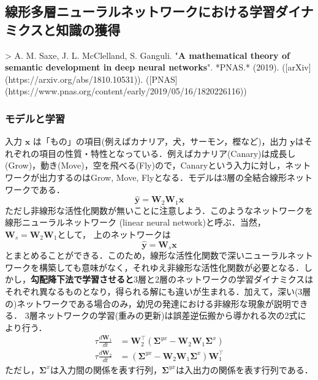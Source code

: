 \subsection{線形多層ニューラルネットワークにおける学習ダイナミクスと知識の獲得}> A. M. Saxe, J. L. McClelland, S. Ganguli. "\textbf{A mathematical theory of semantic development in deep neural networks}". *PNAS.* (2019). ([arXiv](https://arxiv.org/abs/1810.10531)). ([PNAS](https://www.pnas.org/content/early/2019/05/16/1820226116))
\subsubsection{モデルと学習}入力 $\mathbf{x}$ は「もの」の項目(例えばカナリア，犬，サーモン，樫など)，出力 $\mathbf{y}$はそれぞれの項目の性質・特性となっている．例えばカナリア(Canary)は成長し(Grow)，動き(Move)，空を飛べる(Fly)ので，Canaryという入力に対し，ネットワークが出力するのはGrow, Move, Flyとなる．モデルは3層の全結合線形ネットワークである．
$$
\hat{\mathbf{y}}=\mathbf{W}_2 \mathbf{W}_1\mathbf{x} 
$$
ただし非線形な活性化関数が無いことに注意しよう．このようなネットワークを線形ニューラルネットワーク (linear neural network)と呼ぶ．当然， $\mathbf{W}_s=\mathbf{W}_2 \mathbf{W}_1$として， 上のネットワークは
$$
\hat{\mathbf{y}}=\mathbf{W}_s\mathbf{x}
$$
とまとめることができる．このため，線形な活性化関数で深いニューラルネットワークを構築しても意味がなく，それゆえ非線形な活性化関数が必要となる．しかし，\textbf{勾配降下法で学習させると}3層と2層のネットワークの学習ダイナミクスはそれぞれ異なるものとなり，得られる解にも違いが生まれる．加えて，深い(3層の)ネットワークである場合のみ，幼児の発達における非線形な現象が説明できる．
3層ネットワークの学習(重みの更新)は誤差逆伝搬から導かれる次の2式により行う．
$$
\begin{aligned} \tau \frac{d\mathbf{W}_1}{dt} &=\mathbf{W}_2^\top \left(\mathbf{\Sigma}^{yx} - \mathbf{W}_2 \mathbf{W}_1 \mathbf{\Sigma}^{x}\right)\\
\tau \frac{d\mathbf{W}_2}{dt} &=\left(\mathbf{\Sigma}^{yx} - \mathbf{W}_2 \mathbf{W}_1 \mathbf{\Sigma}^{x}\right) \mathbf{W}_1^\top
\end{aligned}
$$
ただし，$ \mathbf{\Sigma}^{x}$は入力間の関係を表す行列，$\mathbf{\Sigma}^{yx}$は入出力の関係を表す行列である．
